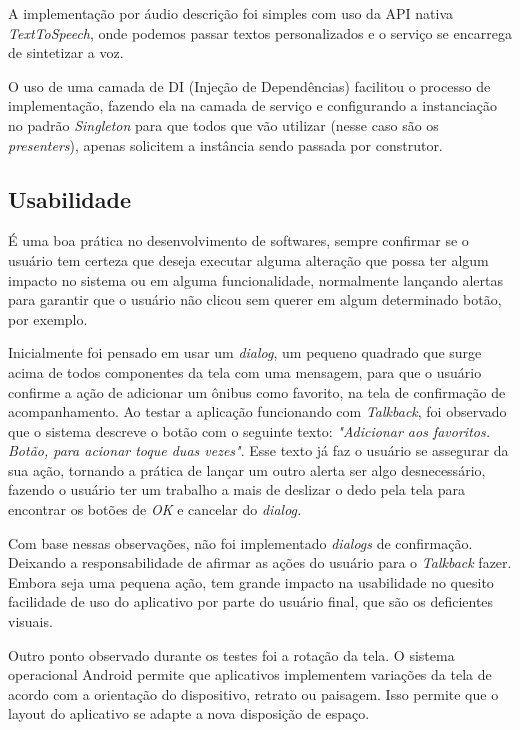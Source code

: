 \documentclass[
	12pt,				%
	oneside,			%
	a4paper,			%
	brazil				%
]{abntex2}
\begin{document}
{A implementação por áudio descrição foi simples com uso da API nativa \textit{TextToSpeech}, onde podemos passar textos personalizados e o serviço se encarrega de sintetizar a voz.

O uso de uma camada de DI (Injeção de Dependências) facilitou o processo de implementação, fazendo ela na camada de serviço e configurando a instanciação no padrão \textit{Singleton} para que todos que vão utilizar (nesse caso são os \textit{presenters}), apenas solicitem a instância sendo passada por construtor.

\subsection{Usabilidade}

É uma boa prática no desenvolvimento de softwares, sempre confirmar se o usuário tem certeza que deseja executar alguma alteração que possa ter algum impacto no sistema ou em alguma funcionalidade, normalmente lançando alertas para garantir que o usuário não clicou sem querer em algum determinado botão, por exemplo. 

Inicialmente foi pensado em usar um \textit{dialog}, um pequeno quadrado que surge acima de todos componentes da tela com uma mensagem, para que o usuário confirme a ação de adicionar um ônibus como favorito, na tela de confirmação de acompanhamento. Ao testar a aplicação funcionando com \textit{Talkback}, foi observado que o sistema descreve o botão com o seguinte texto: \textit{"Adicionar aos favoritos. Botão, para acionar toque duas vezes"}. Esse texto já faz o usuário se assegurar da sua ação, tornando a prática de lançar um outro alerta ser algo desnecessário, fazendo o usuário ter um trabalho a mais de deslizar o dedo pela tela para encontrar os botões de \textit{OK} e cancelar do \textit{dialog.}

Com base nessas observações, não foi implementado \textit{dialogs} de confirmação. Deixando a responsabilidade de afirmar as ações do usuário para o \textit{Talkback} fazer. Embora seja uma pequena ação, tem grande impacto na usabilidade no quesito facilidade de uso do aplicativo por parte do usuário final, que são os deficientes visuais.

Outro ponto observado durante os testes foi a rotação da tela. O sistema operacional Android permite que aplicativos implementem variações da tela de acordo com a orientação do dispositivo, retrato ou paisagem. Isso permite que o layout do aplicativo se adapte a nova disposição de espaço.

}
\end{document}
